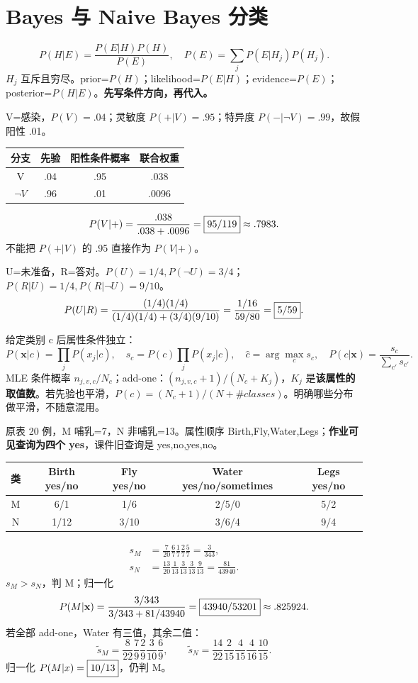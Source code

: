 \section{Bayes 与 Naive Bayes 分类}\label{sec:bayes}
\[
P(H|E)=\frac{P(E|H)P(H)}{P(E)},\quad
P(E)=\sum_jP(E|H_j)P(H_j).
\]
$H_j$ 互斥且穷尽。prior=$P(H)$；likelihood=$P(E|H)$；evidence=$P(E)$；posterior=$P(H|E)$。\textbf{先写条件方向，再代入。}

V=感染，$P(V)=.04$；灵敏度 $P(+|V)=.95$；特异度 $P(-|\neg V)=.99$，故假阳性 .01。
\begin{center}\begin{tabular}{c|c|c|c}\toprule
分支&先验&阳性条件概率&联合权重\\\midrule
V&.04&.95&.038\\$\neg V$&.96&.01&.0096\\\bottomrule\end{tabular}\end{center}
\[
P(V|+)=\frac{.038}{.038+.0096}=\boxed{95/119}\approx.7983.
\]
不能把 $P(+|V)$ 的 .95 直接作为 $P(V|+)$。

U=未准备，R=答对。$P(U)=1/4,P(\neg U)=3/4$；$P(R|U)=1/4,P(R|\neg U)=9/10$。
\[
P(U|R)=\frac{(1/4)(1/4)}{(1/4)(1/4)+(3/4)(9/10)}
=\frac{1/16}{59/80}=\boxed{5/59}.
\]

给定类别 c 后属性条件独立：
\[
P(\mathbf x|c)=\prod_jP(x_j|c),\quad s_c=P(c)\prod_jP(x_j|c),\quad
\widehat c=\arg\max_c s_c,\quad P(c|\mathbf x)=\frac{s_c}{\sum_{c'}s_{c'}}.
\]
MLE 条件概率 $n_{j,v,c}/N_c$；add-one：$(n_{j,v,c}+1)/(N_c+K_j)$，$K_j$ 是\textbf{该属性的取值数}。若先验也平滑，$P(c)=(N_c+1)/(N+\#classes)$。明确哪些分布做平滑，不随意混用。

原表 20 例，M 哺乳=7，N 非哺乳=13。属性顺序 Birth,Fly,Water,Legs；\textbf{作业可见查询为四个 yes}，课件旧查询是 yes,no,yes,no。
\begin{center}\small\begin{tabular}{c|c|c|c|c}\toprule
类&Birth yes/no&Fly yes/no&Water yes/no/sometimes&Legs yes/no\\\midrule
M&6/1&1/6&2/5/0&5/2\\N&1/12&3/10&3/6/4&9/4\\\bottomrule\end{tabular}\end{center}
\[
\begin{aligned}
s_M&=\frac7{20}\frac67\frac17\frac27\frac57=\frac3{343},\\
s_N&=\frac{13}{20}\frac1{13}\frac3{13}\frac3{13}\frac9{13}=\frac{81}{43940}.
\end{aligned}
\]
$s_M>s_N$，判 M；归一化
\[
P(M|\mathbf x)=\frac{3/343}{3/343+81/43940}=\boxed{43940/53201}\approx.825924.
\]
若全部 add-one，Water 有三值，其余二值：
\[
\widetilde s_M=\frac8{22}\frac79\frac29\frac3{10}\frac69,\qquad
\widetilde s_N=\frac{14}{22}\frac2{15}\frac4{15}\frac4{16}\frac{10}{15}.
\]
归一化 $P(M|x)=\boxed{10/13}$，仍判 M。

